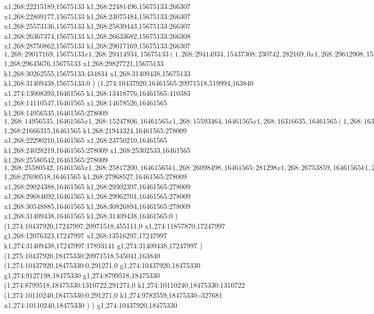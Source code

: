 {x1,268:22215189,15675133
k1,268:22481496,15675133:266307
x1,268:22809177,15675133
k1,268:23075484,15675133:266307
x1,268:25573136,15675133
k1,268:25839443,15675133:266307
x1,268:26367374,15675133
k1,268:26633682,15675133:266308
x1,268:28750862,15675133
k1,268:29017169,15675133:266307
$1,268:29017169,15675133
x1,268:29414934,15675133
(1,268:29414934,15437308:230742,282169,0
x1,268:29612908,15437308
)
$1,268:29645676,15675133
x1,268:29827721,15675133
k1,268:30262555,15675133:434834
x1,268:31409438,15675133
k1,268:31409438,15675133:0
)
(1,274:10437920,16461565:20971518,519994,163840
x1,274:13008393,16461565
k1,268:13418776,16461565:410383
x1,268:14110547,16461565
x1,268:14678526,16461565
k1,268:14956535,16461565:278009
$1,268:14956535,16461565
x1,268:15247806,16461565
x1,268:15593464,16461565
x1,268:16316635,16461565
(1,268:16316635,16223740:230742,282169,0
x1,268:16514609,16223740
)
x1,268:16802240,16461565
k1,268:17083538,16461565:281298
x1,268:17593264,16461565
k1,268:17874562,16461565:281298
x1,268:18195417,16461565
x1,268:18918588,16461565
(1,268:18918588,16223740:230742,282169,0
x1,268:19116562,16223740
)
x1,268:19404193,16461565
k1,268:19294969,16461565:-109224
k1,268:19480305,16461565:185336
x1,268:19990031,16461565
k1,268:19880807,16461565:-109224
k1,268:20066142,16461565:185335
x1,268:20386997,16461565
x1,268:21110168,16461565
(1,268:21110168,16223740:301284,213447,0
x1,268:21378684,16223740
)
x1,268:21666315,16461565
$1,268:21666315,16461565
k1,268:21944324,16461565:278009
x1,268:22290210,16461565
x1,268:23750210,16461565
k1,268:24028219,16461565:278009
x1,268:25302533,16461565
k1,268:25580542,16461565:278009
$1,268:25580542,16461565
x1,268:25817200,16461565
k1,268:26098498,16461565:281298
x1,268:26753859,16461565
k1,268:27035157,16461565:281298
x1,268:27690518,16461565
$1,268:27690518,16461565
k1,268:27968527,16461565:278009
x1,268:29024388,16461565
k1,268:29302397,16461565:278009
x1,268:29684692,16461565
k1,268:29962701,16461565:278009
x1,268:30548885,16461565
k1,268:30826894,16461565:278009
x1,268:31409438,16461565
k1,268:31409438,16461565:0
)
(1,274:10437920,17247997:20971518,455111,0
x1,274:11857870,17247997
g1,268:12076323,17247997
x1,268:13516297,17247997
k1,274:31409438,17247997:17893141
g1,274:31409438,17247997
)
(1,275:10437920,18475330:20971518,545041,163840
(1,274:10437920,18475330:0,291271,0
g1,274:10437920,18475330
g1,274:9127198,18475330
g1,274:8799518,18475330
(1,274:8799518,18475330:1310722,291271,0
k1,274:10110240,18475330:1310722
(1,274:10110240,18475330:0,291271,0
k1,274:9782559,18475330:-327681
x1,274:10110240,18475330
)
)
g1,274:10437920,18475330
}
